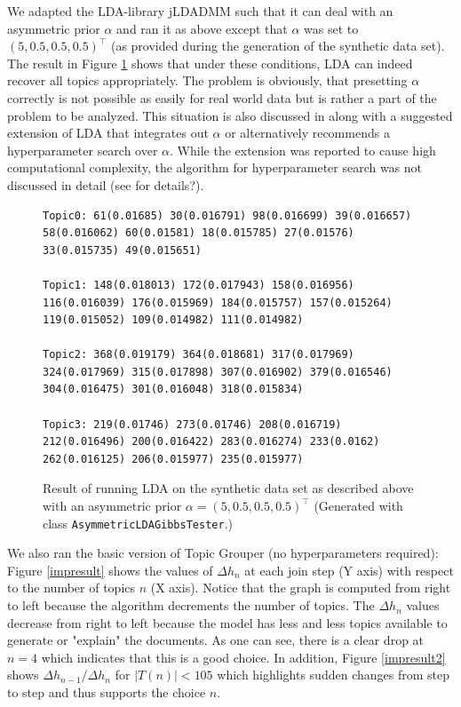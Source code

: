 \documentclass[10pt, a4paper, oneside]{article}
\begin{document}
We adapted the LDA-library jLDADMM such that it can deal with an asymmetric prior $\alpha$ and ran it as above except that $\alpha$ was set to
$(5, 0.5, 0.5, 0.5)^\top$ (as provided during the generation of the synthetic data set). The result in Figure \ref{ldaasymresult} shows that under these conditions, LDA can indeed recover all topics appropriately. The problem is obviously, that presetting $\alpha$ correctly is not possible as easily for real world data but is rather a part of the problem to be analyzed. This situation is also discussed in \cite{conf/nips/WallachMM09} along with a suggested extension of LDA that integrates out $\alpha$ or alternatively recommends a hyperparameter search over $\alpha$. While the extension was reported to cause high computational complexity, the algorithm for hyperparameter search was not discussed in detail (see \cite{wallach08} for details?).

\begin{figure}
{\tiny
\begin{verbatim}
Topic0: 61(0.01685) 30(0.016791) 98(0.016699) 39(0.016657) 58(0.016062) 60(0.01581) 18(0.015785) 27(0.01576) 33(0.015735) 49(0.015651)

Topic1: 148(0.018013) 172(0.017943) 158(0.016956) 116(0.016039) 176(0.015969) 184(0.015757) 157(0.015264) 119(0.015052) 109(0.014982) 111(0.014982)

Topic2: 368(0.019179) 364(0.018681) 317(0.017969) 324(0.017969) 315(0.017898) 307(0.016902) 379(0.016546) 304(0.016475) 301(0.016048) 318(0.015834)

Topic3: 219(0.01746) 273(0.01746) 208(0.016719) 212(0.016496) 200(0.016422) 283(0.016274) 233(0.0162) 262(0.016125) 206(0.015977) 235(0.015977)
\end{verbatim}}
\caption{Result of running LDA on the synthetic data set as described above with an asymmetric prior $\alpha = (5, 0.5, 0.5, 0.5)^\top$ (Generated with class \texttt{AsymmetricLDAGibbsTester}.)}
\label{ldaasymresult}
\end{figure}

We also ran the basic version of Topic Grouper (no hyperparameters required):
Figure \ref{impresult} shows the values of $\Delta h_n$ at each join step (Y axis) with respect to the number of topics $n$ (X axis).
Notice that the graph is computed from right to left because the algorithm decrements the number of topics. The $\Delta h_n$ values decrease from right to left because the model has less and less topics available to generate or "explain" the documents. As one can see, there is a clear drop at $n = 4$ which indicates that this is a good choice. In addition, Figure \ref{impresult2} shows $\Delta h_{n-1} / \Delta h_{n}$ for $|T(n)| < 105$ which highlights sudden changes from step to step and thus supports the choice $n$.
\end{document}
